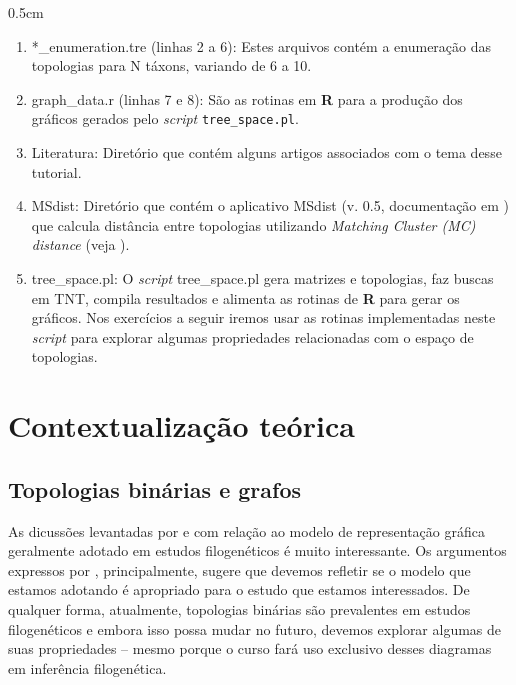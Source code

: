 \begin{refsection}
\begin {myindentpar}{0.5cm}
\begin{enumerate}[\itshape i.]
	\item{*\_enumeration.tre (linhas 2 a 6):} Estes arquivos contém a enumeração das topologias para N táxons, variando de 6 a 10.
	\item{graph\_data\*.r (linhas 7 e 8):} São as rotinas em \textbf{R} para a produção dos gráficos gerados pelo \textit{script} \texttt{tree\_space.pl}.
	\item{Literatura:} Diretório que contém alguns artigos associados com o tema desse tutorial.
	\item{MSdist:}  Diretório que contém o aplicativo MSdist (v. 0.5, documentação em \cite{Bogdanowicz_2010}) que calcula distância entre topologias utilizando \textit{Matching Cluster (MC) distance} (veja \cite{BogdanowiczETGiaro_2013}).
	\item{tree\_space.pl:}  O \textit{script} tree\_space.pl gera matrizes e topologias, faz buscas em TNT, compila resultados e alimenta as rotinas de \textbf{R} para gerar os gráficos. Nos exercícios a seguir iremos usar as rotinas implementadas neste \textit{script} para explorar algumas propriedades relacionadas com o espaço de topologias.

\end{enumerate}
\end{myindentpar}

\section{Contextualização teórica}\label{tut3:context}

\subsection{Topologias binárias e grafos}\label{tut3:context:graphs}
	As dicussões levantadas por \textcite{Mindell_2013} e \textcite{Morrison_2014} com relação ao modelo de representação gráfica geralmente adotado em estudos filogenéticos é muito interessante. Os argumentos expressos por \textcite{Morrison_2014}, principalmente, sugere que devemos refletir se o modelo que estamos adotando é apropriado para o estudo que estamos interessados. De qualquer forma, atualmente, topologias binárias são prevalentes em estudos filogenéticos e embora isso possa mudar no futuro, devemos explorar algumas de suas propriedades -- mesmo porque o curso fará uso exclusivo desses diagramas em inferência filogenética.
	


\end{refsection}
